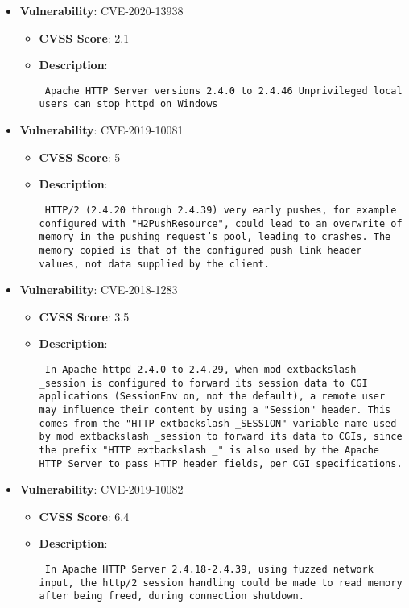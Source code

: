 \documentclass{article}
\begin{document}
\begin{itemize}
        \item \textbf{Vulnerability}: CVE-2020-13938
        \begin{itemize}
            \item \textbf{CVSS Score}:  2.1 
            \item \textbf{Description}: \parbox{\linewidth}{\texttt{ Apache HTTP Server versions 2.4.0 to 2.4.46 Unprivileged local users can stop httpd on Windows }}
        \end{itemize}
    
        \item \textbf{Vulnerability}: CVE-2019-10081
        \begin{itemize}
            \item \textbf{CVSS Score}:  5 
            \item \textbf{Description}: \parbox{\linewidth}{\texttt{ HTTP/2 (2.4.20 through 2.4.39) very early pushes, for example configured with "H2PushResource", could lead to an overwrite of memory in the pushing request's pool, leading to crashes. The memory copied is that of the configured push link header values, not data supplied by the client. }}
        \end{itemize}
    
        \item \textbf{Vulnerability}: CVE-2018-1283
        \begin{itemize}
            \item \textbf{CVSS Score}:  3.5 
            \item \textbf{Description}: \parbox{\linewidth}{\texttt{ In Apache httpd 2.4.0 to 2.4.29, when mod	extbackslash _session is configured to forward its session data to CGI applications (SessionEnv on, not the default), a remote user may influence their content by using a "Session" header. This comes from the "HTTP	extbackslash _SESSION" variable name used by mod	extbackslash _session to forward its data to CGIs, since the prefix "HTTP	extbackslash _" is also used by the Apache HTTP Server to pass HTTP header fields, per CGI specifications. }}
        \end{itemize}
    
        \item \textbf{Vulnerability}: CVE-2019-10082
        \begin{itemize}
            \item \textbf{CVSS Score}:  6.4 
            \item \textbf{Description}: \parbox{\linewidth}{\texttt{ In Apache HTTP Server 2.4.18-2.4.39, using fuzzed network input, the http/2 session handling could be made to read memory after being freed, during connection shutdown. }}
        \end{itemize}
    

\end{itemize}
\end{document}
